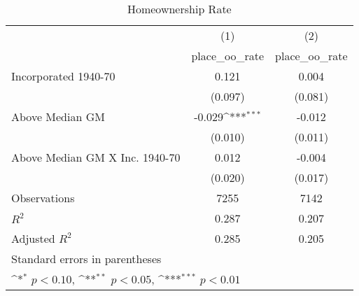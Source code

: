 \begin{table}[htbp]\centering
\def\sym#1{\ifmmode^{#1}\else\(^{#1}\)\fi}
\caption{Homeownership Rate}
\begin{tabular}{l*{2}{c}}
\hline\hline
                    &\multicolumn{1}{c}{(1)}&\multicolumn{1}{c}{(2)}\\
                    &\multicolumn{1}{c}{place\_oo\_rate}&\multicolumn{1}{c}{place\_oo\_rate}\\
\hline
Incorporated 1940-70&       0.121         &       0.004         \\
                    &     (0.097)         &     (0.081)         \\
[1em]
Above Median GM     &      -0.029\sym{***}&      -0.012         \\
                    &     (0.010)         &     (0.011)         \\
[1em]
Above Median GM X Inc. 1940-70&       0.012         &      -0.004         \\
                    &     (0.020)         &     (0.017)         \\
\hline
Observations        &        7255         &        7142         \\
\(R^{2}\)           &       0.287         &       0.207         \\
Adjusted \(R^{2}\)  &       0.285         &       0.205         \\
\hline\hline
\multicolumn{3}{l}{\footnotesize Standard errors in parentheses}\\
\multicolumn{3}{l}{\footnotesize \sym{*} \(p<0.10\), \sym{**} \(p<0.05\), \sym{***} \(p<0.01\)}\\
\end{tabular}
\end{table}
